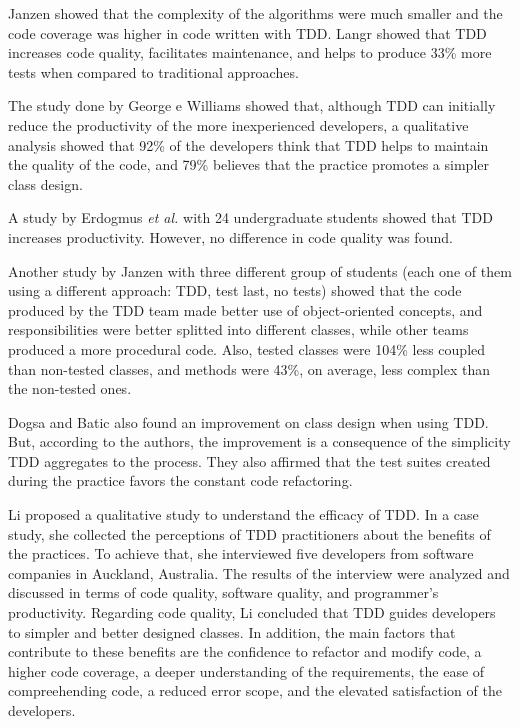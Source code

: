 \documentclass[conference]{IEEEtran}
\begin{document}
Janzen \cite{janzen-arch-improvement} showed that the complexity of the algorithms
were much smaller and the code coverage was higher in code written with TDD.
Langr \cite{langr} showed that TDD increases code quality, facilitates
maintenance, and helps to produce 33\% more tests when compared to traditional
approaches.

The study done by George e Williams \cite{george-e-williams} showed that,
although TDD can initially reduce the productivity of the more inexperienced
developers, a qualitative analysis showed that 92\% of the developers think
that TDD helps to maintain the quality of the code, and 79\% believes that
the practice promotes a simpler class design.

A study by Erdogmus \textit{et al.} \cite{erdogmus-morisio} with 24 undergraduate students
showed that TDD increases productivity. However, no difference in code quality
was found.

Another study by Janzen \cite{janzen-saiedian} with three different group
of students (each one of them using a different approach: TDD, test last, no tests)
showed that the code produced by the TDD team made better use of object-oriented
concepts, and responsibilities were better splitted into different classes,
while other teams produced a more procedural code. Also, tested classes were
104\% less coupled than non-tested classes, and methods were 43\%, on average, less complex
than the non-tested ones.

Dogsa and Batic \cite{dogsa-batic} also found an improvement on class design when
using TDD. But, according to the authors, the improvement is a consequence of the simplicity
TDD aggregates to the process. They also affirmed that the test suites created during
the practice favors the constant code refactoring.


Li \cite{angela-li} proposed a qualitative study to understand the efficacy of TDD.
In a case study, she collected the perceptions of TDD practitioners about the
benefits of the practices. To achieve that, she interviewed five developers
from software companies in Auckland, Australia. The results of the interview
were analyzed and discussed in terms of code quality, software quality, and
programmer's productivity. Regarding code quality, Li concluded that TDD
guides developers to simpler and better designed classes. In addition, the main
factors that contribute to these benefits are the confidence to refactor and
modify code, a higher code coverage, a deeper understanding of the requirements,
the ease of compreehending code, a reduced error scope, and the elevated
satisfaction of the developers.
\end{document}
